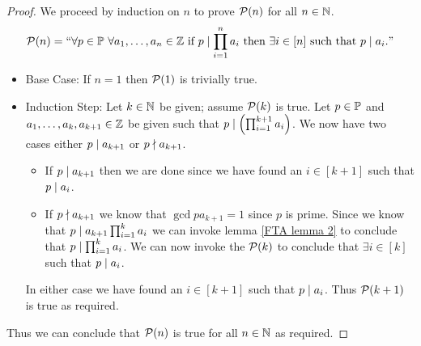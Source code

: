         \begin{proof}
            We proceed by induction on $n$ to prove $\mathcal{P}(n)$ for all $n \in \mathbb{N}$.
            \[
                \inductive{P}{n} = ``\forall p \in \set{P} \ \forall a_1, \dots, a_n \in \set{Z}
                                    \mbox{ if } \divides{p}{\prod_{i = 1}^{n} a_i} \mbox{ then } 
                                    \exists i \in [n] \mbox{ such that } \divides{p}{a_i}."
            \]
            \begin{itemize}
                \item
                    Base Case: If $n = 1$ then $\mathcal{P}(1)$ is trivially true.
                \item
                    Induction Step: Let $k \in \mathbb{N}$ be given; assume $\mathcal{P}(k)$ is
                    true. Let $p \in \mathbb{P}$ and $a_1, \dots, a_k, a_{k + 1} \in \mathbb{Z}$ be
                    given such that $p \mid \left(\prod_{i = 1}^{k + 1} a_i\right)$.
                    We now have two cases either $p \mid a_{k + 1}$ or $p \nmid a_{k + 1}$.
                    \begin{itemize}
                        \item
                            If $p \mid a_{k + 1}$ then we are done since we have found an
                            $i \in [k + 1]$ such that $p \mid a_i$.
                        \item
                            If $p \nmid a_{k + 1}$ we know that $\gcd{p}{a_{k + 1}} = 1$
                            since $p$ is prime. Since we know that $p \mid a_{k + 1} \prod_{i = 1}^{k} a_i$
                            we can invoke lemma \ref{FTA lemma 2} to conclude that $p \mid \prod_{i = 1}^k a_i$.
                            We can now invoke the $\mathcal{P}(k)$ to conclude that $\exists i \in [k]$
                            such that $p \mid a_i$.
                    \end{itemize}
                    In either case we have found an $i \in [k + 1]$ such that $p \mid a_i$.
                    Thus $\mathcal{P}(k + 1)$ is true as required.
            \end{itemize}
            Thus we can conclude that $\mathcal{P}(n)$ is true for all $n \in \mathbb{N}$
            as required. \QED
        \end{proof}
